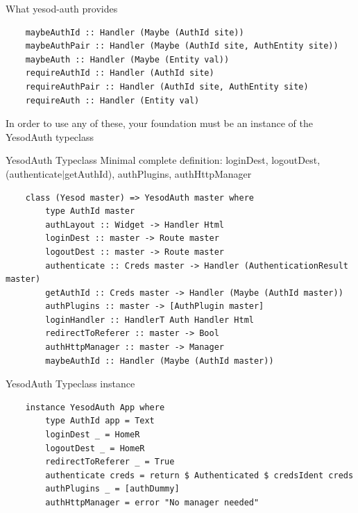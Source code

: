 \documentclass[pdf]{beamer}
\begin{document}
\begin{frame}[fragile]{What yesod-auth provides}
  \begin{verbatim}
    maybeAuthId :: Handler (Maybe (AuthId site))
    maybeAuthPair :: Handler (Maybe (AuthId site, AuthEntity site))
    maybeAuth :: Handler (Maybe (Entity val))
    requireAuthId :: Handler (AuthId site)
    requireAuthPair :: Handler (AuthId site, AuthEntity site)
    requireAuth :: Handler (Entity val)
  \end{verbatim}
  \pause
  In order to use any of these, your foundation must be an instance of
  the YesodAuth typeclass
\end{frame}

\begin{frame}[fragile]{YesodAuth Typeclass}
  Minimal complete definition: loginDest, logoutDest,
  (authenticate$|$getAuthId), authPlugins, authHttpManager \\
  \begin{verbatim}
    class (Yesod master) => YesodAuth master where
        type AuthId master
        authLayout :: Widget -> Handler Html
        loginDest :: master -> Route master
        logoutDest :: master -> Route master
        authenticate :: Creds master -> Handler (AuthenticationResult master)
        getAuthId :: Creds master -> Handler (Maybe (AuthId master))
        authPlugins :: master -> [AuthPlugin master]
        loginHandler :: HandlerT Auth Handler Html
        redirectToReferer :: master -> Bool
        authHttpManager :: master -> Manager
        maybeAuthId :: Handler (Maybe (AuthId master))
  \end{verbatim}
\end{frame}

\begin{frame}[fragile]{YesodAuth Typeclass instance}
  \begin{verbatim}
    instance YesodAuth App where
        type AuthId app = Text
        loginDest _ = HomeR
        logoutDest _ = HomeR
        redirectToReferer _ = True
        authenticate creds = return $ Authenticated $ credsIdent creds
        authPlugins _ = [authDummy]
        authHttpManager = error "No manager needed"
  \end{verbatim}
\end{frame}
\end{document}
